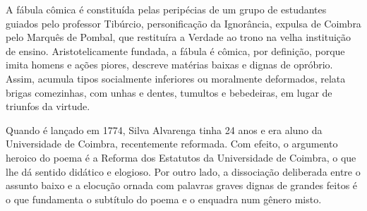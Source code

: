 \hspace*{-7cm}\hrulefill\hspace*{-7cm}

\medskip

\noindent{}A fábula cômica é constituída pelas peripécias de um grupo de estudantes guiados pelo professor Tibúrcio, personificação da Ignorância, expulsa de Coimbra pelo Marquês de Pombal, que restituíra a Verdade ao trono na velha instituição de ensino. Aristotelicamente fundada, a fábula é cômica, por definição, porque imita homens e ações piores, descreve matérias baixas e dignas de opróbrio. Assim, acumula tipos socialmente inferiores ou moralmente deformados, relata brigas comezinhas, com unhas e dentes, tumultos e bebedeiras, em lugar de triunfos da virtude.

Quando {} é lançado em 1774, Silva Alvarenga tinha 24 anos e era aluno da Universidade de Coimbra, recentemente reformada. Com efeito, o argumento heroico do poema é a Reforma dos Estatutos da Universidade de Coimbra, o que lhe dá sentido didático e elogioso. Por outro lado, a dissociação deliberada entre o assunto baixo e a elocução ornada com palavras graves dignas de grandes feitos é o que fundamenta o subtítulo do poema e o enquadra num gênero misto.

\vfill

\hspace*{-.4cm}\begin{minipage}[c]{.5\linewidth}
\small{
{}}
\end{minipage}

\pagebreak

\hspace{.5cm}

